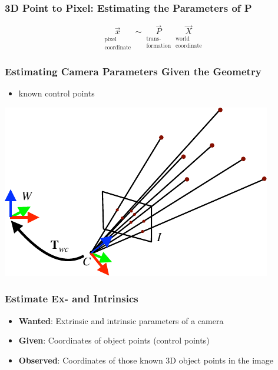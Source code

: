 \begin{frame}
  \frametitle{3D Point to Pixel: Estimating the Parameters of P}
  \begin{equation*}
    \underset{\substack{\text{pixel}\\ \text{coordinate}}}{\vec{x}} \sim \underset{\substack{\text{trans-}\\ \text{formation}}}{\vec{P}}
    \underset{\substack{\text{world}\\ \text{coordinate}}}{\vec{X}}
  \end{equation*}  
\end{frame}

\begin{frame}
  \frametitle{Estimating Camera Parameters Given the Geometry}
  \begin{itemize}
    \item known control points
  \end{itemize}
  \begin{center}
    \includegraphics[width=0.5\columnwidth]{./images/dlt_3d_2d.pdf}
  \end{center}
\end{frame}

\begin{frame}
  \frametitle{Estimate Ex- and Intrinsics}
  \begin{itemize}
    \item \textbf{Wanted}: Extrinsic and intrinsic parameters of a camera
    \item \textbf{Given}: Coordinates of object points (control points)
    \item \textbf{Observed}: Coordinates of those known 3D object points in the image
  \end{itemize}
\end{frame}

